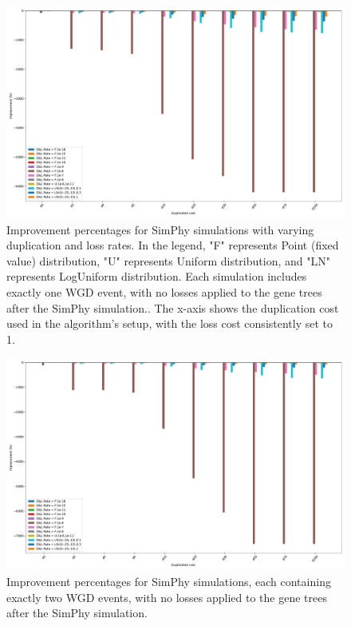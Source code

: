 \documentclass[10pt]{article}
\begin{document}
\begin{figure}[hbt!]
    \centering
    \includegraphics[width=1\textwidth]{figs/imp-1WGD-beforelosses.pdf}
    \caption{Improvement percentages for SimPhy simulations with varying duplication and loss rates. In the legend, "F" represents Point (fixed value) distribution, "U" represents Uniform distribution, and "LN" represents LogUniform distribution. Each simulation includes exactly one WGD event, with no losses applied to the gene trees after the SimPhy simulation.. The x-axis shows the duplication cost used in the algorithm's setup, with the loss cost consistently set to 1.}
    \label{fig:imp_1wgd_beforelosses}
\end{figure}

\begin{figure}[hbt!]
    \centering
    \includegraphics[width=1\textwidth]{figs/imp-2WGD-beforelosses.pdf}
    \caption{Improvement percentages for SimPhy simulations, each containing exactly two WGD events, with no losses applied to the gene trees after the SimPhy simulation.}
    \label{fig:imp_2wgd_beforelosses}
\end{figure}
\end{document}
